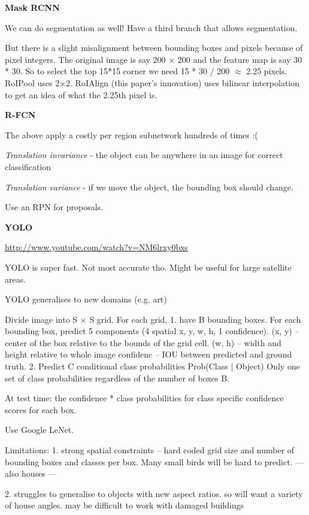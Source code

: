 \documentclass[12pt, a4paper, oneside, headinclude, footinclude]{article}
\begin{document}
\textbf{Mask RCNN}~\cite{he2017}

We can do segmentation as well! Have a third branch that allows segmentation. 

But there is a slight misalignment between bounding boxes and pixels because
of pixel integers. The original image is say 200 $\times$ 200 and the feature map is
say 30 * 30. So to select the top 15*15 corner we need 15 * 30 / 200 $\approx$
2.25 pixels. RoIPool uses 2$\times$2. RoIAlign (this paper's innovation) uses
bilinear interpolation to get an idea of what the 2.25th pixel is.


\textbf{R-FCN}~\cite{NIPS2016_6465}

The above apply a costly per region subnetwork hundreds of times :(

\textit{Translation invariance} - the object can be anywhere in an image for
correct classification

\textit{Translation variance} - if we move the object, the bounding box should
change. 

Use an RPN for proposals.

\textbf{YOLO}~\cite{redmon2016yolo}

\url{http://www.youtube.com/watch?v=NM6lrxy0bxs}

YOLO is super fast. Not most accurate tho. Might be useful for large satellite
areas.

YOLO generalises to new domains (e.g. art)

Divide image into S $\times$ S grid. 
For each grid, 
    1. have B bounding boxes. 
    For each bounding box, 
        predict 5 components (4 spatial {x, y, w, h}, 1 confidence). 
        (x, y) -- center of the box relative to the bounds of the grid cell. 
        (w, h) -- width and height relative to whole image
        confidenc -- IOU between predicted and ground truth.
    2. Predict C conditional class probabilities
       Prob(Class | Object)
       Only one set of class probabilities regardless of the number of boxes
       B.

At test time: the confidence * class probabilities for class specific
confidence scores for each box.

Use Google LeNet.

Limitations: 
1. strong spatial constraints -- hard coded grid size and number of
bounding boxes and classes per box. Many small birds will be hard to predict.
--- also houses ---

2. struggles to generalise to objects with new aspect ratios. so will want a
variety of house angles. may be difficult to work with damaged buildings 
\end{document}
